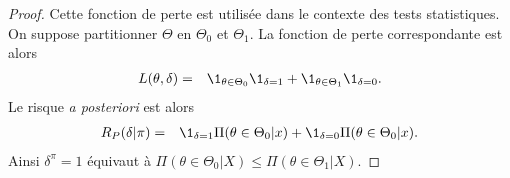 \begin{proof}%
 Cette fonction de perte est utilisée dans le contexte des tests statistiques. On suppose partitionner $\Theta$ en $\Theta_0$ et $\Theta_1$. La fonction de perte correspondante est alors
 \begin{eqnarray*}
 L(\theta,\delta) & = & \1_{\theta\in\Theta_0} \1_{\delta=1} + \1_{\theta\in\Theta_1} \1_{\delta=0}.
 \end{eqnarray*}
 Le risque {\it a posteriori} est alors
 \begin{eqnarray*}
 R_P(\delta|\pi) & = & \1_{\delta=1} \Pi(\theta\in\Theta_0|x) + \1_{\delta=0} \Pi(\theta\in\Theta_0|x). 
 \end{eqnarray*}
 Ainsi $\delta^{\pi}=1$ équivaut à $\Pi(\theta\in\Theta_0|X)\leq \Pi(\theta\in\Theta_1|X)$.
\end{proof}